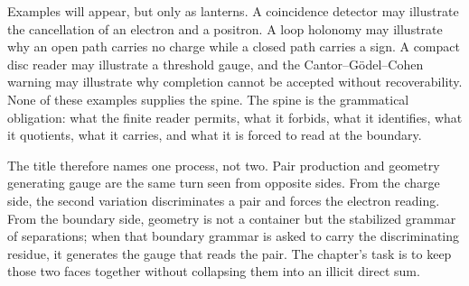 Examples will appear, but only as lanterns. A coincidence detector may
illustrate the cancellation of an electron and a positron. A loop holonomy
may illustrate why an open path carries no charge while a closed path carries
a sign. A compact disc reader may illustrate a threshold gauge, and the
Cantor--G\"odel--Cohen warning may illustrate why completion cannot be
accepted without recoverability. None of these examples supplies the spine.
The spine is the grammatical obligation: what the finite reader permits,
what it forbids, what it identifies, what it quotients, what it carries, and
what it is forced to read at the boundary.

The title therefore names one process, not two. Pair production and geometry
generating gauge are the same turn seen from opposite sides. From the charge
side, the second variation discriminates a pair and forces the electron
reading. From the boundary side, geometry is not a container but the
stabilized grammar of separations; when that boundary grammar is asked to
carry the discriminating residue, it generates the gauge that reads the pair.
The chapter's task is to keep those two faces together without collapsing
them into an illicit direct sum.

